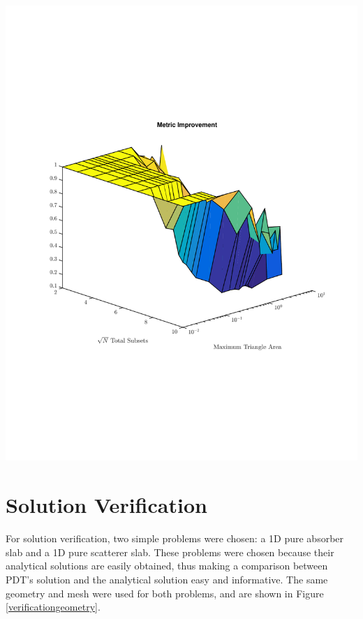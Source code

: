 \noindent\begin{minipage}{\textwidth}
\centering
\includegraphics[scale=0.80, trim = 0cm 3cm 0cm 3cm,clip]{figures/SameDiff.pdf}
\label{samediff}
\end{minipage}


\section{Solution Verification}

For solution verification, two simple problems were chosen: a 1D pure absorber slab and a 1D pure scatterer slab. These problems were chosen because their analytical solutions are easily obtained, thus making a comparison between PDT's solution and the analytical solution easy and informative. The same geometry and mesh were used for both problems, and are shown in Figure \ref{verificationgeometry}.

